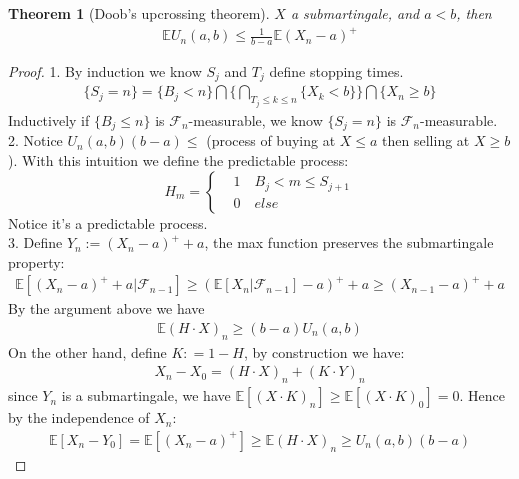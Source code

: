 \documentclass[a4paper,11pt]{book}
\newtheorem{theorem}{Theorem}[section]
\theoremstyle{definition}
\theoremstyle{remark}
\begin{document}
\begin{theorem}[Doob's upcrossing theorem]
	$X$ a submartingale, and $a < b$, then 
	\begin{align*}
		\mathbb{E}U_n(a, b) \leq  \frac{1}{b-a} \mathbb{E}(X_n - a)^+
	\end{align*}
\end{theorem}
\begin{proof}
1. By induction we know $S_j$ and $T_j$ define stopping times.
	\begin{align*}
		\{S_j = n\} = \{B_j < n\} \bigcap \bigg\{ \bigcap_{T_j \leq k \leq n}  \{ X_k < b\} \bigg\} \bigcap \{X_n \geq b\}
	\end{align*}
	Inductively if $\{B_j \leq n\}$ is $\mathcal{F}_{n}$-measurable, we know $\{S_j = n\}$ is $\mathcal{F}_n$-measurable.\\
2. Notice $U_n(a, b) (b - a) \leq$ (process of buying at $X \leq a$ then selling at $X \geq b$). With this intuition we define the predictable process:
\begin{equation*}
H_m =  \left\{
\begin{aligned}
	&1 \quad B_j < m \leq S_{j+1}\\
	&0 \quad else
\end{aligned}
\right.
\end{equation*} 
Notice it's a predictable process.\\  
3. Define $Y_n := (X_n - a)^+ + a$, the max function preserves the submartingale property:
	\begin{align*}
		\mathbb{E}[(X_n - a)^+ + a | \mathcal{F}_{n-1}] \geq (\mathbb{E}[X_n|\mathcal{F}_{n-1}] - a)^+ + a
		\geq (X_{n-1} - a)^+ + a
	\end{align*}
	By the argument above we have
	\begin{align*}
		\mathbb{E}(H \cdot X)_n \geq (b-a) U_n(a,b)
	\end{align*}
	On the other hand, define $K: = 1 - H$,  by construction we have:
	\begin{align*}
		X_n - X_0  = (H\cdot X)_n + (K\cdot Y)_n
	\end{align*}
	since $Y_n$ is a submartingale, we have $\mathbb{E}[(X\cdot K)_n] \geq \mathbb{E}[(X\cdot K)_0]  = 0$. Hence by the independence of $X_n$:
	\begin{align*}
		\mathbb{E}[X_n - Y_0] = \mathbb{E}[(X_n - a)^+] \geq \mathbb{E}(H\cdot X)_n \geq U_n(a, b)(b - a)
	\end{align*} 
\end{proof}
\end{document}
